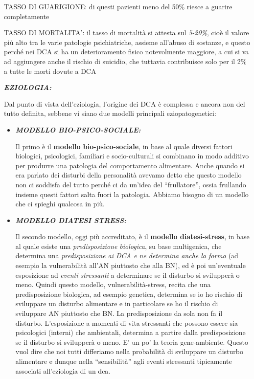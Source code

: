 \documentclass[]{article}
\begin{document}
TASSO DI GUARIGIONE: di questi pazienti meno del 50\% riesce a guarire
completamente

TASSO DI MORTALITA': il tasso di mortalità si attesta sul \emph{5-20\%},
cioè il valore più alto tra le varie patologie psichiatriche, assieme
all'abuso di sostanze, e questo perché nei DCA si ha un deterioramento
fisico notevolmente maggiore, a cui si va ad aggiungere anche il rischio
di suicidio, che tuttavia contribuisce solo per il 2\% a tutte le morti
dovute a DCA

\textbf{\emph{EZIOLOGIA:}}

Dal punto di vista dell'eziologia, l'origine dei DCA è complessa e
ancora non del tutto definita, sebbene vi siano due modelli principali
eziopatogenetici:

\begin{itemize}
\item
  \textbf{\emph{MODELLO BIO-PSICO-SOCIALE:}}

  Il primo è il \textbf{modello bio-psico-sociale}, in base al quale
  diversi fattori biologici, psicologici, familiari e socio-culturali si
  combinano in modo additivo per produrre una patologia del
  comportamento alimentare. Anche quando si era parlato dei disturbi
  della personalità avevamo detto che questo modello non ci soddisfa del
  tutto perché ci da un'idea del ``frullatore'', ossia frullando insieme
  questi fattori salta fuori la patologia. Abbiamo bisogno di un modello
  che ci spieghi qualcosa in più.
\item
  \textbf{\emph{MODELLO DIATESI STRESS:}}

  Il secondo modello, oggi più accreditato, è il \textbf{modello
  diatesi-stress}, in base al quale esiste una \emph{predisposizione
  biologica}, su base multigenica, che determina una
  \emph{predisposizione ai DCA e ne determina anche la forma} (ad
  esempio la vulnerabilità all'AN piuttosto che alla BN), ed è poi
  un'eventuale esposizione ad \emph{eventi stressanti} a determinare se
  il disturbo si svilupperà o meno. Quindi questo modello,
  vulnerabilità-stress, recita che una predisposizione biologica, ad
  esempio genetica, determina se io ho rischio di sviluppare un disturbo
  alimentare e in particolare se ho il rischio di sviluppare AN
  piuttosto che BN. La predisposizione da sola non fa il disturbo.
  L'esposizione a momenti di vita stressanti che possono essere sia
  psicologici (interni) che ambientali, determina a partire dalla
  predisposizione se il disturbo si svilupperà o meno. E' un po' la
  teoria gene-ambiente. Questo vuol dire che noi tutti differiamo nella
  probabilità di sviluppare un disturbo alimentare e dunque nella
  ``sensibilità'' agli eventi stressanti tipicamente associati
  all'eziologia di un dca.
\end{itemize}
\end{document}
